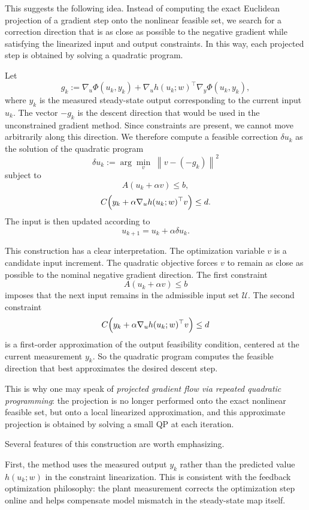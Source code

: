 This suggests the following idea. Instead of computing the exact Euclidean projection of a gradient step onto the nonlinear feasible set, we search for a correction direction that is as close as possible to the negative gradient while satisfying the linearized input and output constraints. In this way, each projected step is obtained by solving a quadratic program.

Let
\[
g_k:=
\nabla_u \Phi(u_k,y_k)
+
\nabla_u h(u_k;w)^\top \nabla_y \Phi(u_k,y_k),
\]
where $y_k$ is the measured steady-state output corresponding to the current input $u_k$. The vector $-g_k$ is the descent direction that would be used in the unconstrained gradient method. Since constraints are present, we cannot move arbitrarily along this direction. We therefore compute a feasible correction $\delta u_k$ as the solution of the quadratic program
\[
\delta u_k
:=
\arg\min_{v}\;
\left\|
v-(-g_k)
\right\|^2
\]
subject to
\[
A(u_k+\alpha v)\le b,
\]
\[
C\Bigl(y_k+\alpha \nabla_u h(u_k;w)^\top v\Bigr)\le d.
\]
The input is then updated according to
\[
u_{k+1}=u_k+\alpha \delta u_k.
\]

This construction has a clear interpretation. The optimization variable $v$ is a candidate input increment. The quadratic objective forces $v$ to remain as close as possible to the nominal negative gradient direction. The first constraint
\[
A(u_k+\alpha v)\le b
\]
imposes that the next input remains in the admissible input set $\mathcal U$. The second constraint
\[
C\Bigl(y_k+\alpha \nabla_u h(u_k;w)^\top v\Bigr)\le d
\]
is a first-order approximation of the output feasibility condition, centered at the current measurement $y_k$. So the quadratic program computes the feasible direction that best approximates the desired descent step.

This is why one may speak of \emph{projected gradient flow via repeated quadratic programming}: the projection is no longer performed onto the exact nonlinear feasible set, but onto a local linearized approximation, and this approximate projection is obtained by solving a small QP at each iteration.

Several features of this construction are worth emphasizing.

First, the method uses the measured output $y_k$ rather than the predicted value $h(u_k;w)$ in the constraint linearization. This is consistent with the feedback optimization philosophy: the plant measurement corrects the optimization step online and helps compensate model mismatch in the steady-state map itself.

